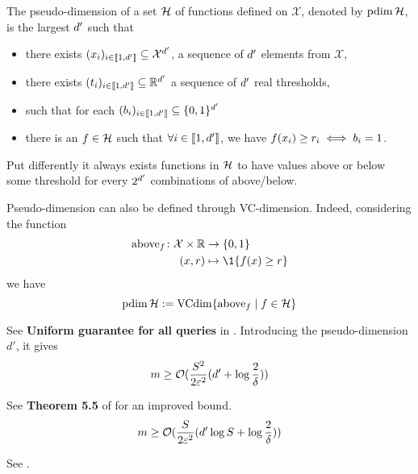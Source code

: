 \begin{tcolorbox}
	\begin{definition}
		The pseudo-dimension of a set $\mathcal{H}$ of functions defined on $\mathcal{X}$, denoted by $\operatorname{pdim}\mathcal{H}$, is the largest ${d'}$ such that 
	\begin{itemize}
		\item there exists $(x_{i})_{i\in \llbracket 1,{d'} \rrbracket} \subseteq \mathcal{X}^{d'}$, a sequence of ${d'}$ elements from $\mathcal{X}$,
		\item there exists $(t_i)_{i\in \llbracket 1,{d'} \rrbracket} \subseteq  \mathbb{R}^{d'}$ a sequence of ${d'}$ real thresholds,
		\item such that for each $(b_i)_{i\in \llbracket 1,{d'} \rrbracket} \subseteq \{0,1\}^{d'}$
		\item there is an $f \in \mathcal{H}$ such that $\forall i \in \llbracket 1,{d'} \rrbracket$, we have $f(x_i) \geq r_i \iff b_i = 1$. 
	\end{itemize}
	Put differently it always exists functions in $\mathcal{H}$ to have values above or below some threshold for every $2^{d'}$ combinations of above/below.
\end{definition}
Pseudo-dimension can also be defined through VC-dimension. Indeed, considering the function
\begin{align*}
	\operatorname{above}_\query \colon \mathcal{X} \times \RR &\to \{0,1\}\\
	(x,r) &\mapsto \1\{f(x) \geq r\}
\end{align*}
we have
\begin{equation}
	\operatorname{pdim}\mathcal{H} := \operatorname{VCdim}\{\operatorname{above}_f \mid f \in \mathcal{H}\}
\end{equation}
\end{tcolorbox}





See \textbf{Uniform guarantee for all queries} in \cite{bachem2017coresetML}. Introducing the pseudo-dimension $d'$, it gives
\begin{equation}
	m \geq \mathcal{O}(\frac{S^{2}}{2 \varepsilon^{2}} (d' + \log \frac{2}{\delta}))
\end{equation}

See \textbf{Theorem 5.5} of \cite{braverman2016coresetsota} for an improved bound.
\begin{equation}
	m \geq \mathcal{O}(\frac{S}{2 \varepsilon^{2}} (d' \log S + \log \frac{2}{\delta}))
\end{equation}

See \cite{bachem2017coresetML}.
